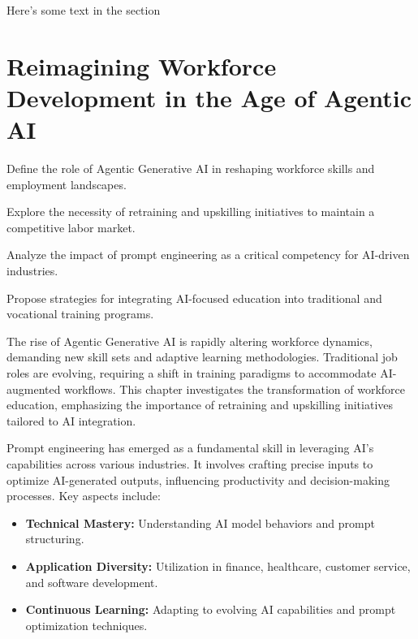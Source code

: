 \documentclass[a4paper,headinclude=on,footinclude=on,12pt,oneside]{scrbook}
\begin{document}
Here's some text in the section



\chapter{Reimagining Workforce Development in the Age of Agentic AI}

\begin{arrows}
	\item Define the role of Agentic Generative AI in reshaping workforce skills and employment landscapes.
	\item Explore the necessity of retraining and upskilling initiatives to maintain a competitive labor market.
	\item Analyze the impact of prompt engineering as a critical competency for AI-driven industries.
	\item Propose strategies for integrating AI-focused education into traditional and vocational training programs.
\end{arrows}


The rise of Agentic Generative AI is rapidly altering workforce dynamics, demanding new skill sets and adaptive learning methodologies. Traditional job roles are evolving, requiring a shift in training paradigms to accommodate AI-augmented workflows. This chapter investigates the transformation of workforce education, emphasizing the importance of retraining and upskilling initiatives tailored to AI integration.


Prompt engineering has emerged as a fundamental skill in leveraging AI’s capabilities across various industries. It involves crafting precise inputs to optimize AI-generated outputs, influencing productivity and decision-making processes. Key aspects include:
\begin{itemize}
	\item \textbf{Technical Mastery:} Understanding AI model behaviors and prompt structuring.
	\item \textbf{Application Diversity:} Utilization in finance, healthcare, customer service, and software development.
	\item \textbf{Continuous Learning:} Adapting to evolving AI capabilities and prompt optimization techniques.
\end{itemize}
\end{document}
